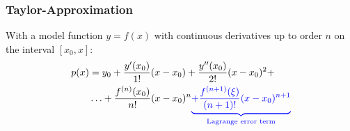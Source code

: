 \subsubsection{Taylor-Approximation}

With a model function $y=f(x)$ with continuous derivatives up to order $n$ on the interval $[x_0,x]$:
\begin{align*}
    p(x) & = y_0 + \frac{y'(x_0)}{1!}(x-x_0) + \frac{y''(x_0)}{2!}(x-x_0)^2 + \\
    \ & \ldots + \frac{f^{(n)}(x_0)}{n!}(x-x_0)^n {\color{blue} \underbrace{+ \frac{f^{(n+1)}(\xi)}{(n+1)!}(x-x_0)^{n+1}}_{\text{Lagrange error term}}}
\end{align*}
